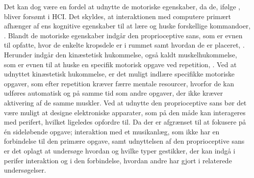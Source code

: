 Det kan dog være en fordel at udnytte de motoriske egenskaber, da de, ifølge \textcite[s. 187]{PDF:PIDesktopComputingKap9}, bliver forsømt i HCI. Det skyldes, at interaktionen med computere primært afhænger af ens kognitive egenskaber til at lære og huske forskellige kommandoer, \parencite[s. 187]{PDF:PIDesktopComputingKap9}. Blandt de motoriske egenskaber indgår den proprioceptive sans, som er evnen til opfatte, hvor de enkelte kropsdele er i rummet samt hvordan de er placeret, \parencite[s. 193]{PDF:PIDesktopComputingKap9}. Herunder indgår den kinæstetisk hukommelse, også kaldt muskelhukommelse, som er evnen til at huske en specifik motorisk opgave ved repetition, \parencite[s. 193]{PDF:PIDesktopComputingKap9}. Ved at udnyttet kinæstetisk hukommelse, er det muligt indlære specifikke motoriske opgaver, som efter repetition kræver færre mentale resourcer, hvorfor de kan udføres automatisk og på samme tid som andre opgaver, der ikke kræver aktivering af de samme muskler. Ved at udnytte den proprioceptive sans bør det være muligt at designe elektroniske apparater, som på den måde kan interageres med perifert, hvilket \textcite[s. 202]{PDF:PIDesktopComputingKap9} ligeledes opfordre til.\blankline
%
Da der er afgrænset til at fokusere på én sideløbende opgave; interaktion med et musikanlæg, som ikke har en forbindelse til den primære opgave, samt udnyttelsen af den proprioceptive sans er det oplagt at undersøge hvordan og hvilke typer gestikker, der kan indgå i perifer interaktion og i den forbindelse, hvordan andre har gjort i relaterede undersøgelser.      
 